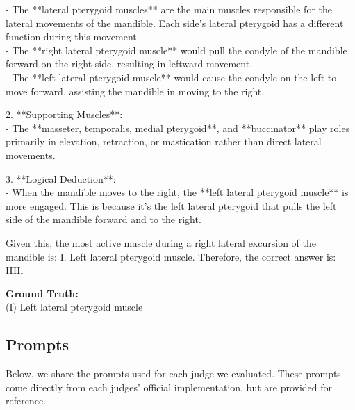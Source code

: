 \documentclass{article} %
\begin{document}
\begin{tcolorbox}[colback=gray!5!white, colframe=gray!60!black, title=Example of disagreement between solution checkers., breakable]
- The **lateral pterygoid muscles** are the main muscles responsible for the lateral movements of the mandible. Each side's lateral pterygoid has a different function during this movement.\\
- The **right lateral pterygoid muscle** would pull the condyle of the mandible forward on the right side, resulting in leftward movement.\\
- The **left lateral pterygoid muscle** would cause the condyle on the left to move forward, assisting the mandible in moving to the right.\\\par
2. **Supporting Muscles**:\\
- The **masseter, temporalis, medial pterygoid**, and **buccinator** play roles primarily in elevation, retraction, or mastication rather than direct lateral movements.\\\par
3. **Logical Deduction**:\\
- When the mandible moves to the right, the **left lateral pterygoid muscle** is more engaged. This is because it's the left lateral pterygoid that pulls the left side of the mandible forward and to the right.\\\par
Given this, the most active muscle during a right lateral excursion of the mandible is: I. Left lateral pterygoid muscle. Therefore, the correct answer is: IIIIi\\\par
\textbf{Ground Truth:}\\
(I) Left lateral pterygoid muscle
\end{tcolorbox}

\subsection{Prompts}
\label{appendix:prompts}
Below, we share the prompts used for each judge we evaluated. These prompts come directly from each judges' official implementation, but are provided for reference.
\end{document}

